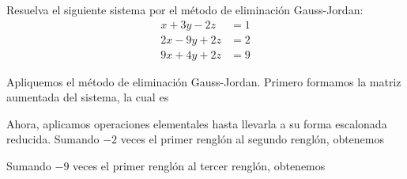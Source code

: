 \begin{examplebox}{}{}
    Resuelva el siguiente sistema por el método de eliminación Gauss-Jordan:
    \begin{align*}
        x + 3y - 2z & = 1 \\
        2x - 9y + 2z & = 2 \\
        9x + 4y + 2z & = 9
    \end{align*}

    \tcblower
    \solucion Apliquemos el método de eliminación Gauss-Jordan. Primero formamos la matriz aumentada del sistema, la cual es
    \begin{matrizn}
    \end{matrizn}
    Ahora, aplicamos operaciones elementales hasta llevarla a su forma escalonada reducida. Sumando $-2$ veces el primer renglón al segundo renglón, obtenemos
    \begin{matrizn}
    \end{matrizn}
    Sumando $-9$ veces el primer renglón al tercer renglón, obtenemos
    \begin{matrizn}

\end{matrizn}
\end{examplebox}
